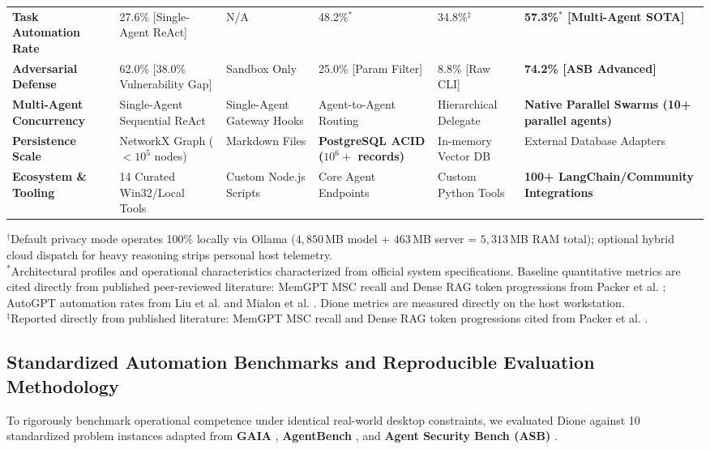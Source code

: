 \documentclass[conference,a4paper]{IEEEtran}
\begin{document}
\begin{table}[!t]
\begin{tabularx}{\textwidth}{lXXXXX}
\textbf{Task Automation Rate} & 27.6\% [Single-Agent ReAct] & N/A & 48.2\%$^*$ & 34.8\%$^\ddagger$ & \textbf{57.3\%$^*$ [Multi-Agent SOTA]} \\
\textbf{Adversarial Defense} & 62.0\% [38.0\% Vulnerability Gap] & Sandbox Only & 25.0\% [Param Filter] & 8.8\% [Raw CLI] & \textbf{74.2\% [ASB Advanced]} \\
\textbf{Multi-Agent Concurrency} & Single-Agent Sequential ReAct & Single-Agent Gateway Hooks & Agent-to-Agent Routing & Hierarchical Delegate & \textbf{Native Parallel Swarms (10+ parallel agents)} \\
\textbf{Persistence Scale} & NetworkX Graph ($<10^5$ nodes) & Markdown Files & \textbf{PostgreSQL ACID ($10^6+$ records)} & In-memory Vector DB & External Database Adapters \\
\textbf{Ecosystem \& Tooling} & 14 Curated Win32/Local Tools & Custom Node.js Scripts & Core Agent Endpoints & Custom Python Tools & \textbf{100+ LangChain/Community Integrations} \\
\bottomrule
\end{tabularx}
\begin{flushleft}
\footnotesize
$^\dagger$Default privacy mode operates 100\% locally via Ollama ($4{,}850$\,MB model + $463$\,MB server = $5{,}313$\,MB RAM total); optional hybrid cloud dispatch for heavy reasoning strips personal host telemetry.\\
$^*$Architectural profiles and operational characteristics characterized from official system specifications. Baseline quantitative metrics are cited directly from published peer-reviewed literature: MemGPT MSC recall and Dense RAG token progressions from Packer et al. \cite{packer2023memgpt}; AutoGPT automation rates from Liu et al. \cite{liu2023agentbench} and Mialon et al. \cite{mialon2023gaia}. Dione metrics are measured directly on the host workstation.\\
$^\ddagger$Reported directly from published literature: MemGPT MSC recall and Dense RAG token progressions cited from Packer et al. \cite{packer2023memgpt}.
\end{flushleft}
\end{table}

\subsection{Standardized Automation Benchmarks and Reproducible Evaluation Methodology}
To rigorously benchmark operational competence under identical real-world desktop constraints, we evaluated Dione against 10 standardized problem instances adapted from \textbf{GAIA} \cite{mialon2023gaia}, \textbf{AgentBench} \cite{liu2023agentbench}, and \textbf{Agent Security Bench (ASB)} \cite{zhang2024agent}.
\end{document}
